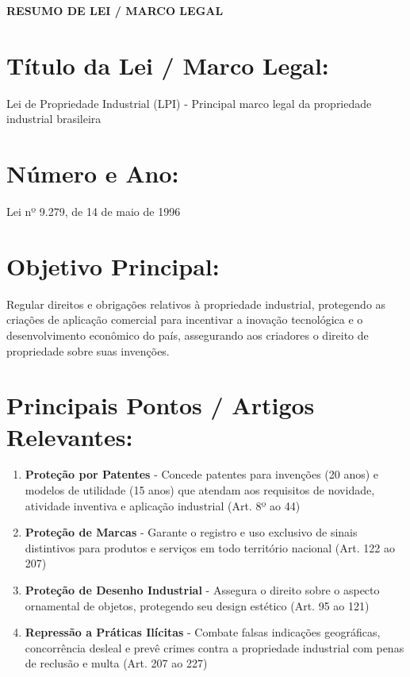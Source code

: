 \documentclass[12pt, a4paper]{article}
\begin{document}
\begin{center}
    {\large \textbf{RESUMO DE LEI / MARCO LEGAL}}
\end{center}

\section{Título da Lei / Marco Legal:}
Lei de Propriedade Industrial (LPI) - Principal marco legal da propriedade industrial brasileira

\section{Número e Ano:}
Lei nº 9.279, de 14 de maio de 1996

\section{Objetivo Principal:}
Regular direitos e obrigações relativos à propriedade industrial, protegendo as criações de aplicação comercial para incentivar a inovação tecnológica e o desenvolvimento econômico do país, assegurando aos criadores o direito de propriedade sobre suas invenções.

\section{Principais Pontos / Artigos Relevantes:}
\begin{enumerate}[label=\textbf{Ponto \arabic*:}, leftmargin=*, align=left]
    \item \textbf{Proteção por Patentes} - Concede patentes para invenções (20 anos) e modelos de utilidade (15 anos) que atendam aos requisitos de novidade, atividade inventiva e aplicação industrial (Art. 8º ao 44)
    
    \item \textbf{Proteção de Marcas} - Garante o registro e uso exclusivo de sinais distintivos para produtos e serviços em todo território nacional (Art. 122 ao 207)
    
    \item \textbf{Proteção de Desenho Industrial} - Assegura o direito sobre o aspecto ornamental de objetos, protegendo seu design estético (Art. 95 ao 121)
    
    \item \textbf{Repressão a Práticas Ilícitas} - Combate falsas indicações geográficas, concorrência desleal e prevê crimes contra a propriedade industrial com penas de reclusão e multa (Art. 207 ao 227)
\end{enumerate}
\end{document}
